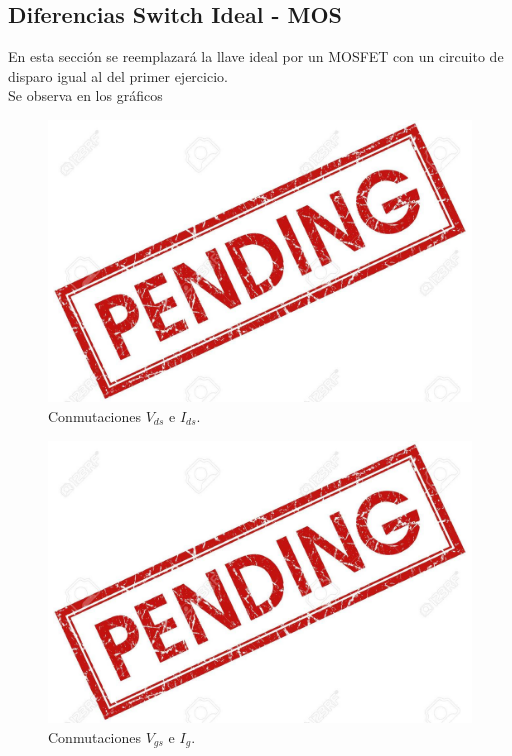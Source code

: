 



\subsection{Diferencias Switch Ideal - MOS}
En esta sección se reemplazará la llave ideal por un MOSFET con un circuito de disparo igual al del primer ejercicio.\\
Se observa en los gráficos 
\begin{multicols}{2}
\begin{figure}[H]
	\centering
	\includegraphics[width=0.9\linewidth]{ImagenesEjercicio-3/pend}
	\caption{Conmutaciones $V_{ds}$ e  $I_{ds}$.}
	\label{fig:ej3:conmutacionON_OFF_VDS_IDS}
\end{figure}
\begin{figure}[H]
	\centering
	\includegraphics[width=0.9\linewidth]{ImagenesEjercicio-3/pend}
	\caption{Conmutaciones $V_{gs}$ e  $I_{g}$.}
	\label{fig:ej3:conmutacionON_OFF_VGS_IG}
\end{figure}
\end{multicols}

